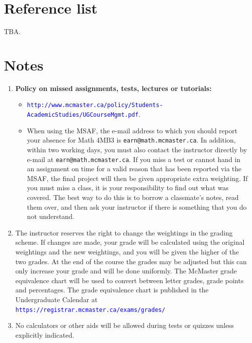 \documentclass[12pt]{article}
\newcommand{\url}[1]{{\tt\textcolor{blue}{#1}}}
\begin{document}
\section*{Reference list}

TBA. 

\section*{Notes}

\begin{enumerate}\addtolength{\itemsep}{-0.5\baselineskip}

\item {\bf Policy on missed assignments, tests, lectures or tutorials:} 
\begin{itemize}
\item \url{http://www.mcmaster.ca/policy/Students-AcademicStudies/UGCourseMgmt.pdf}.
\item When using the MSAF, the e-mail address to which you should report your absence for Math 4MB3 is {\tt earn@math.mcmaster.ca}.  In addition, within two working days, you must also contact the instructor directly by e-mail at {\tt earn@math.mcmaster.ca}.  If you miss a test or cannot hand in an assignment on time for a valid reason that has been reported via the MSAF, the final project will then be given appropriate extra weighting.  If you must miss a class, it is your responsibility to find out what was covered.  The best way to do this is to borrow a classmate's notes, read them over, and then ask your instructor if there is something that you do not understand.
\end{itemize}

\item The instructor reserves the right to change the weightings in the grading scheme. If changes are made, your grade will be calculated using the original weightings and the new weightings, and you will be given the higher of the two grades.  At the end of the course the grades may be adjusted but this can only increase your grade and will be done uniformly.  The McMaster grade equivalence chart will be used to convert between letter grades, grade points and percentages.  The grade equivalence chart is published in the Undergraduate Calendar at \url{https://registrar.mcmaster.ca/exams/grades/}

\item No calculators or other aids will be allowed during tests or quizzes unless explicitly indicated.


\end{enumerate}
\end{document}
